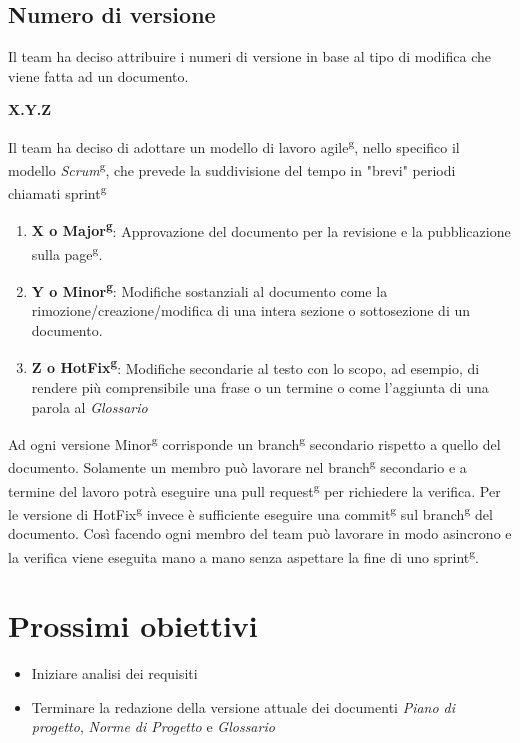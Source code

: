     \subsection{Numero di versione}
        Il team ha deciso attribuire i numeri di versione in base al tipo di modifica che viene fatta ad un documento.
        \begin{center}
            \textbf{X.Y.Z}
        \end{center}
        Il team ha deciso di adottare un modello di lavoro agile\textsuperscript{g}, nello specifico il modello \textit{Scrum}\textsuperscript{g}, che prevede la suddivisione del tempo in "brevi" periodi chiamati sprint\textsuperscript{g}
        \begin{enumerate}
            \item \textbf{X o Major\textsuperscript{g}}: Approvazione del documento per la revisione e la pubblicazione sulla page\textsuperscript{g}.
            \item \textbf{Y o Minor\textsuperscript{g}}: Modifiche sostanziali al documento come la rimozione/creazione/modifica di una intera sezione o sottosezione di un documento.
            \item \textbf{Z o HotFix\textsuperscript{g}}: Modifiche secondarie al testo con lo scopo, ad esempio, di rendere più comprensibile una frase o un termine o come l'aggiunta di una parola al \textit{Glossario}
        \end{enumerate}
        Ad ogni versione Minor\textsuperscript{g} corrisponde un branch\textsuperscript{g} secondario rispetto a quello del documento. Solamente un membro può lavorare nel branch\textsuperscript{g} secondario e a termine del lavoro 
        potrà eseguire una pull request\textsuperscript{g} per richiedere la verifica. Per le versione di HotFix\textsuperscript{g} invece è sufficiente eseguire una commit\textsuperscript{g} sul branch\textsuperscript{g} del documento.
        Così facendo ogni membro del team può lavorare in modo asincrono e la verifica viene eseguita mano a mano senza aspettare la fine di uno sprint\textsuperscript{g}.
\section{Prossimi obiettivi}
   \begin{itemize}
        \item Iniziare analisi dei requisiti
        \item Terminare la redazione della versione attuale dei documenti \textit{Piano di progetto}, \textit{Norme di Progetto} e \textit{Glossario}
    \end{itemize}
